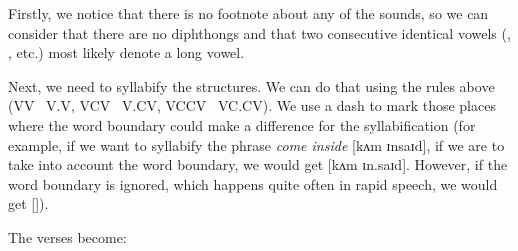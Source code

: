 \begin{refsection}
\begin{mysolution}

Firstly, we notice that there is no footnote about any of the sounds, so we can consider that there are no diphthongs and that two consecutive identical vowels (, , etc.) most likely denote a long vowel.

Next, we need to syllabify the structures. We can do that using the rules above (VV \textrightarrow\ V.V, VCV \textrightarrow\ V.CV, VCCV \textrightarrow\ VC.CV). We use a dash to mark those places where the word boundary could make a difference for the syllabification (for example, if we want to syllabify the phrase \textit{come inside} [{kʌm ɪnsaɪd}], if we are to take into account the word boundary, we would get [{kʌm ɪn.saɪd}]. However, if the word boundary is ignored, which happens quite often in rapid speech, we would get []).

The verses become:


\end{mysolution}
\end{refsection}
